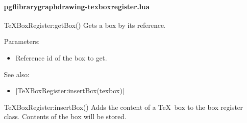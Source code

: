 
\paragraph{pgflibrarygraphdrawing-texboxregister.lua}


\begin{luacommand}{{TeXBoxRegister:getBox}()}
Gets a box by its reference.

Parameters:
\begin{itemize}
	\item[]  \subitem Reference id of the box to get.
\end{itemize}



See also:
\begin{itemize}
	\item[] |TeXBoxRegister:insertBox(texbox)|
\end{itemize}

\end{luacommand}\begin{luacommand}{{TeXBoxRegister:insertBox}()}
Adds the content of a \TeX\ box to the box register class. Contents of the box will be stored. 



\end{luacommand}
